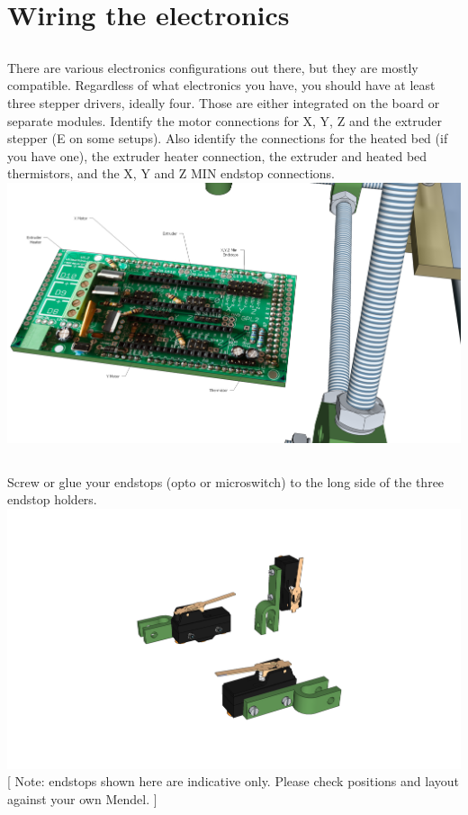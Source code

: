 \documentclass[twoside,openany,a4paper,titlepage]{memoir}
\begin{document}
	\chapter{Wiring the electronics}

	\section{}
	There are various electronics configurations out there, but they are mostly compatible. Regardless of
	what electronics you have, you should have at least three stepper drivers, ideally four. Those are either
	integrated on the board or separate modules. Identify the motor connections for X, Y, Z and the
	extruder stepper (E on some setups). Also identify the connections for the heated bed (if you have one),
	the extruder heater connection, the extruder and heated bed thermistors, and the X, Y and Z MIN
	endstop connections.\\
	\includegraphics[width=1\linewidth]{graphics/ch10_1.png}
	
	\section{}
	Screw or glue your endstops (opto or microswitch) to the long side of the three endstop holders.\\
	\includegraphics[width=1\linewidth]{graphics/ch10_2.png}	
	[ Note: endstops shown here are indicative only. Please check positions and layout against your own Mendel. ]
	
\end{document}
